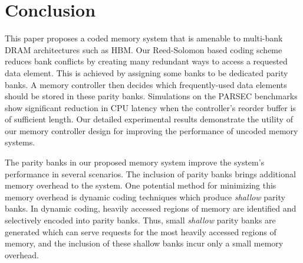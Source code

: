 \section{Conclusion}
\label{sec:conclusion}
This paper proposes a coded memory system that is amenable to multi-bank DRAM architectures such as HBM. Our Reed-Solomon based coding scheme reduces bank conflicts by creating many redundant ways to access a requested data element. This is achieved by assigning some banks to be dedicated parity banks. A memory controller then decides which frequently-used data elements should be stored in these parity banks. Simulations on the PARSEC benchmarks show significant reduction in CPU latency when the controller's reorder buffer is of sufficient length. Our detailed experimental results demonstrate the utility of our memory controller design for improving the performance of uncoded memory systems.

The parity banks in our proposed memory system improve the system's performance in several scenarios. The inclusion of parity banks brings additional memory overhead to the system. One potential method for minimizing this memory overhead is dynamic coding techniques which produce {\em shallow} parity banks. In dynamic coding, heavily accessed regions of memory are identified and selectively encoded into parity banks. Thus, small {\em shallow} parity banks are generated which can serve requests for the most heavily accessed regions of memory, and the inclusion of these shallow banks incur only a small memory overhead.

